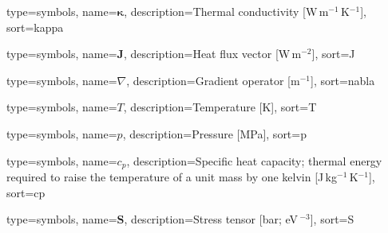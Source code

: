 
{
    type=symbols,
    name=$\boldsymbol{\kappa}$,
    description={Thermal conductivity [W\,m$^{-1}$\,K$^{-1}$]},
    sort=kappa
}

{
    type=symbols,
    name=$\boldsymbol{J}$,
    description={Heat flux vector [W\,m$^{-2}$]},
    sort=J
}

{
    type=symbols,
    name=$\nabla$,
    description={Gradient operator [m$^{-1}$]},
    sort=nabla
}

{
    type=symbols,
    name=$T$,
    description={Temperature [K]},
    sort=T
}

{
    type=symbols,
    name=$p$,
    description={Pressure [MPa]},
    sort=p
}

{
    type=symbols,
    name=$c_p$,
    description={Specific heat capacity; thermal energy required to raise the
        temperature of a unit mass by one kelvin
        [J\,kg$^{-1}$\,K$^{-1}$]},
    sort=cp
}

{
    type=symbols,
    name=$\boldsymbol{S}$,
    description={Stress tensor [bar;\; eV\,\text{\AA}$^{-3}$]},
    sort=S
}